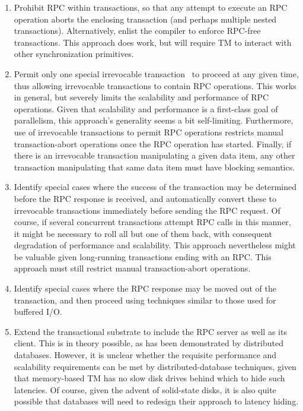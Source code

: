 \begin{enumerate}
\item	Prohibit RPC within transactions, so that any attempt to execute
	an RPC operation aborts the enclosing transaction (and perhaps
	multiple nested transactions).
	Alternatively, enlist the compiler to enforce RPC-free
	transactions.
	This approach does work, but will require TM to
	interact with other synchronization primitives.
\item	Permit only one special
	irrevocable transaction~\cite{SpearMichaelScott2008InevitableSTM}
	to proceed at any given time, thus allowing irrevocable
	transactions to contain RPC operations.
	This works in general, but severely limits the scalability and
	performance of RPC operations.
	Given that scalability and performance is a first-class goal of
	parallelism, this approach's generality seems a bit self-limiting.
	Furthermore, use of irrevocable transactions to permit RPC
	operations restricts manual transaction-abort operations
	once the RPC operation has started.
	Finally, if there is an irrevocable transaction manipulating
	a given data item, any other transaction manipulating that
	same data item must have blocking semantics.
\item	Identify special cases where the success of the transaction may
	be determined before the RPC response is received, and
	automatically convert these to irrevocable transactions immediately
	before sending the RPC request.
	Of course, if several concurrent transactions attempt RPC calls
	in this manner, it might be necessary to roll all but one of them
	back, with consequent degradation of performance and scalability.
	This approach nevertheless might be valuable given long-running
	transactions ending with an RPC\@.
	This approach must still restrict  manual transaction-abort
	operations.
\item	Identify special cases where the RPC response may be moved out
	of the transaction, and then proceed using techniques similar
	to those used for buffered I/O.
\item	Extend the transactional substrate to include the RPC server as
	well as its client.
	This is in theory possible, as has been demonstrated by
	distributed databases.
	However, it is unclear whether the requisite performance and
	scalability requirements can be met by distributed-database
	techniques, given that memory-based TM has no slow disk drives
	behind which to hide such latencies.
	Of course, given the advent of solid-state disks, it is also quite
	possible that databases will need to redesign their approach to
	latency hiding.
\end{enumerate}

